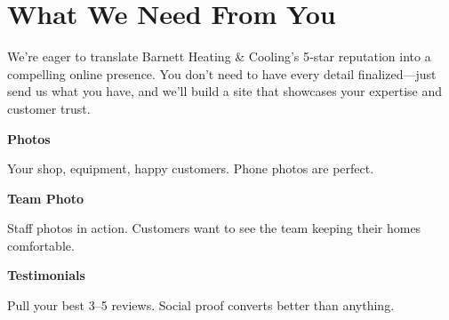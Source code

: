 \documentclass[11pt,letterpaper]{article}
\begin{document}
\vspace{0.2em}

\section*{What We Need From You}

We’re eager to translate Barnett Heating \& Cooling’s 5‑star reputation into a compelling online presence. You don’t need to have every detail finalized—just send us what you have, and we’ll build a site that showcases your expertise and customer trust.

\vspace{0.12em}

\noindent\begin{minipage}[t]{0.48\textwidth}
\begin{tcolorbox}[colframe=accent-teal, boxrule=1pt, left=0.7em, right=0.7em, top=0.5em, bottom=0.5em, arc=4pt, boxsep=0pt]
{\bfseries\small\color{accent-teal}Photos}

\vspace{0.15em}

{\small Your shop, equipment, happy customers. Phone photos are perfect.}
\end{tcolorbox}

\vspace{0.1em}

\begin{tcolorbox}[colframe=accent-teal, boxrule=1pt, left=0.7em, right=0.7em, top=0.5em, bottom=0.5em, arc=4pt, boxsep=0pt]
{\bfseries\small\color{accent-teal}Team Photo}

\vspace{0.15em}

{\small Staff photos in action. Customers want to see the team keeping their homes comfortable.}
\end{tcolorbox}

\vspace{0.1em}

\begin{tcolorbox}[colframe=accent-teal, boxrule=1pt, left=0.7em, right=0.7em, top=0.5em, bottom=0.5em, arc=4pt, boxsep=0pt]
{\bfseries\small\color{accent-teal}Testimonials}

\vspace{0.15em}

{\small Pull your best 3–5 reviews. Social proof converts better than anything.}
\end{tcolorbox}
\end{minipage}
\end{document}
